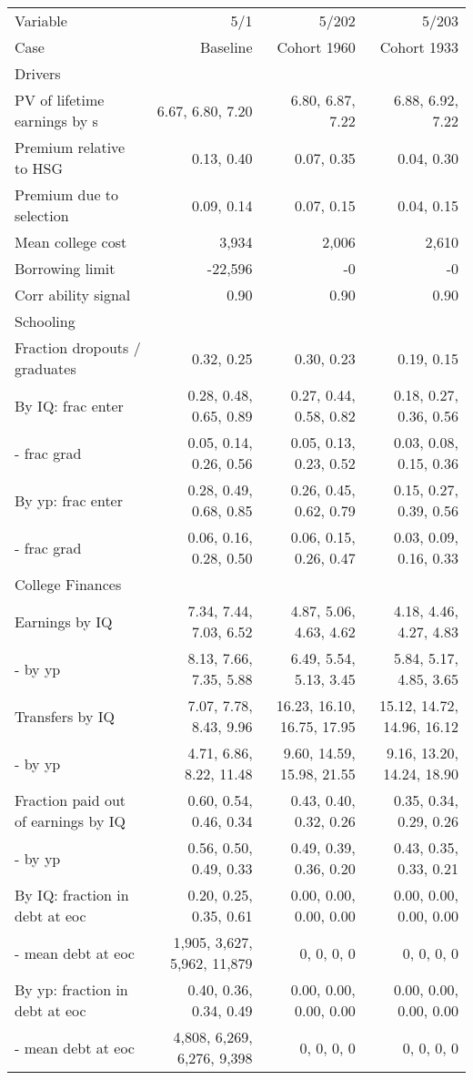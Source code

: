 \begin{tabular}{lrrr}
\hline
Variable & 5/1  & 5/202  & 5/203  \\ 
Case & Baseline  & Cohort 1960  & Cohort 1933  \\ 
Drivers &   &   &   \\ 
PV of lifetime earnings by s & 6.67, 6.80, 7.20  & 6.80, 6.87, 7.22  & 6.88, 6.92, 7.22  \\ 
Premium relative to HSG & 0.13, 0.40  & 0.07, 0.35  & 0.04, 0.30  \\ 
Premium due to selection & 0.09, 0.14  & 0.07, 0.15  & 0.04, 0.15  \\ 
Mean college cost & 3,934  & 2,006  & 2,610  \\ 
Borrowing limit & -22,596  & -0  & -0  \\ 
Corr ability signal & 0.90  & 0.90  & 0.90  \\ 
\hline
Schooling &   &   &   \\ 
Fraction dropouts / graduates & 0.32, 0.25  & 0.30, 0.23  & 0.19, 0.15  \\ 
By IQ: frac enter & 0.28, 0.48, 0.65, 0.89  & 0.27, 0.44, 0.58, 0.82  & 0.18, 0.27, 0.36, 0.56  \\ 
- frac grad & 0.05, 0.14, 0.26, 0.56  & 0.05, 0.13, 0.23, 0.52  & 0.03, 0.08, 0.15, 0.36  \\ 
By yp: frac enter & 0.28, 0.49, 0.68, 0.85  & 0.26, 0.45, 0.62, 0.79  & 0.15, 0.27, 0.39, 0.56  \\ 
- frac grad & 0.06, 0.16, 0.28, 0.50  & 0.06, 0.15, 0.26, 0.47  & 0.03, 0.09, 0.16, 0.33  \\ 
\hline
College Finances &   &   &   \\ 
Earnings by IQ & 7.34, 7.44, 7.03, 6.52  & 4.87, 5.06, 4.63, 4.62  & 4.18, 4.46, 4.27, 4.83  \\ 
- by yp & 8.13, 7.66, 7.35, 5.88  & 6.49, 5.54, 5.13, 3.45  & 5.84, 5.17, 4.85, 3.65  \\ 
Transfers by IQ & 7.07, 7.78, 8.43, 9.96  & 16.23, 16.10, 16.75, 17.95  & 15.12, 14.72, 14.96, 16.12  \\ 
- by yp & 4.71, 6.86, 8.22, 11.48  & 9.60, 14.59, 15.98, 21.55  & 9.16, 13.20, 14.24, 18.90  \\ 
Fraction paid out of earnings by IQ & 0.60, 0.54, 0.46, 0.34  & 0.43, 0.40, 0.32, 0.26  & 0.35, 0.34, 0.29, 0.26  \\ 
- by yp & 0.56, 0.50, 0.49, 0.33  & 0.49, 0.39, 0.36, 0.20  & 0.43, 0.35, 0.33, 0.21  \\ 
By IQ: fraction in debt at eoc & 0.20, 0.25, 0.35, 0.61  & 0.00, 0.00, 0.00, 0.00  & 0.00, 0.00, 0.00, 0.00  \\ 
- mean debt at eoc & 1,905, 3,627, 5,962, 11,879  & 0, 0, 0, 0  & 0, 0, 0, 0  \\ 
By yp: fraction in debt at eoc & 0.40, 0.36, 0.34, 0.49  & 0.00, 0.00, 0.00, 0.00  & 0.00, 0.00, 0.00, 0.00  \\ 
- mean debt at eoc & 4,808, 6,269, 6,276, 9,398  & 0, 0, 0, 0  & 0, 0, 0, 0  \\ 
\hline
\end{tabular}%
